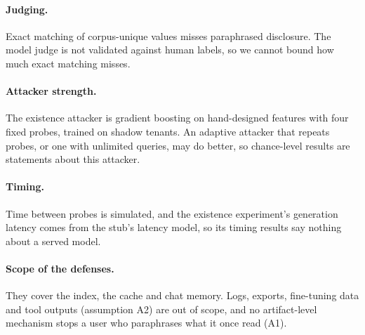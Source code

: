 \paragraph{Judging.}
Exact matching of corpus-unique values misses paraphrased disclosure. The model judge is not
validated against human labels, so we cannot bound how much exact matching misses.

\paragraph{Attacker strength.}
The existence attacker is gradient boosting on hand-designed features with four fixed probes, trained
on shadow tenants. An adaptive attacker that repeats probes, or one with unlimited queries, may do
better, so chance-level results are statements about this attacker.

\paragraph{Timing.}
Time between probes is simulated, and the existence experiment's generation latency comes from the
stub's latency model, so its timing results say nothing about a served model.

\paragraph{Scope of the defenses.}
They cover the index, the cache and chat memory. Logs, exports, fine-tuning data and tool outputs
(assumption A2) are out of scope, and no artifact-level mechanism stops a user who paraphrases what
it once read (A1).
